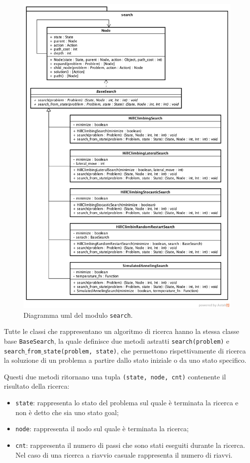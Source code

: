 \begin{figure}[ht]
\centering
\includegraphics[width=\textwidth]{./immagini/search_uml.png}
\caption{Diagramma uml del modulo \texttt{search}.}
\label{fig:uml_search}
\end{figure}


Tutte le classi che rappresentano un algoritmo di ricerca hanno la stessa classe base \texttt{BaseSearch}, la quale definisce due metodi astratti \texttt{search(problem)} e \texttt{search$\_$from$\_$state(problem, state)}, che permettono rispettivamente di ricerca la soluzione di un problema a partire dallo stato iniziale o da uno stato specifico.

Questi due metodi ritornano una tupla \texttt{(state, node, cnt)} contenente il risultato della ricerca:
\begin{itemize}
\item \texttt{state}: rappresenta lo stato del problema sul quale è terminata la ricerca e non è detto che sia uno stato goal;
\item \texttt{node}: rappresenta il nodo sul quale è terminata la ricerca;
\item \texttt{cnt}: rappresenta il numero di passi che sono stati eseguiti durante la ricerca. Nel caso di una ricerca a riavvio casuale rappresenta il numero di riavvi.
\end{itemize}

